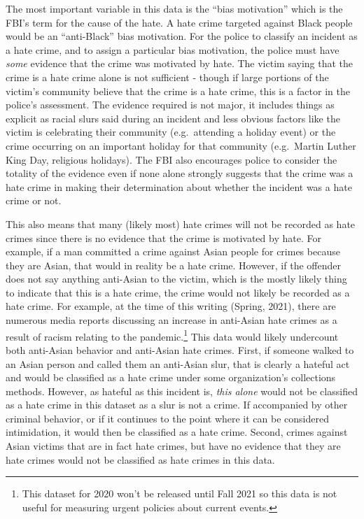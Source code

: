 \documentclass[
  12pt,
  openany]{book}
\begin{document}
The most important variable in this data is the ``bias motivation'' which is the FBI's term for the cause of the hate. A hate crime targeted against Black people would be an ``anti-Black'' bias motivation. For the police to classify an incident as a hate crime, and to assign a particular bias motivation, the police must have \emph{some} evidence that the crime was motivated by hate. The victim saying that the crime is a hate crime alone is not sufficient - though if large portions of the victim's community believe that the crime is a hate crime, this is a factor in the police's assessment. The evidence required is not major, it includes things as explicit as racial slurs said during an incident and less obvious factors like the victim is celebrating their community (e.g.~attending a holiday event) or the crime occurring on an important holiday for that community (e.g.~Martin Luther King Day, religious holidays). The FBI also encourages police to consider the totality of the evidence even if none alone strongly suggests that the crime was a hate crime in making their determination about whether the incident was a hate crime or not.

This also means that many (likely most) hate crimes will not be recorded as hate crimes since there is no evidence that the crime is motivated by hate. For example, if a man committed a crime against Asian people for crimes because they are Asian, that would in reality be a hate crime. However, if the offender does not say anything anti-Asian to the victim, which is the mostly likely thing to indicate that this is a hate crime, the crime would not likely be recorded as a hate crime. For example, at the time of this writing (Spring, 2021), there are numerous media reports discussing an increase in anti-Asian hate crimes as a result of racism relating to the pandemic.\footnote{This dataset for 2020 won't be released until Fall 2021 so this data is not useful for measuring urgent policies about current events.} This data would likely undercount both anti-Asian behavior and anti-Asian hate crimes. First, if someone walked to an Asian person and called them an anti-Asian slur, that is clearly a hateful act and would be classified as a hate crime under some organization's collections methods. However, as hateful as this incident is, \emph{this alone} would not be classified as a hate crime in this dataset as a slur is not a crime. If accompanied by other criminal behavior, or if it continues to the point where it can be considered intimidation, it would then be classified as a hate crime. Second, crimes against Asian victims that are in fact hate crimes, but have no evidence that they are hate crimes would not be classified as hate crimes in this data.
\end{document}
